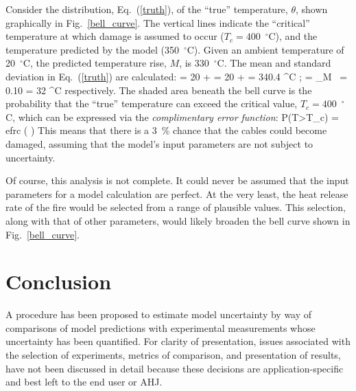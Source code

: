 Consider the distribution, Eq.~(\ref{truth}), of the ``true'' temperature, $\theta$, shown graphically in Fig.~\ref{bell_curve}.
The vertical lines indicate the ``critical'' temperature at which damage is assumed to occur ($T_c=400$~$^\circ$C), and the temperature predicted by the
model (350~$^\circ$C). Given an ambient temperature of 20~$^\circ$C, the predicted temperature rise, $M$, is 330~$^\circ$C.
The mean and standard deviation in Eq.~(\ref{truth}) are calculated:
\be \mu = 20 +  = 20 +  = 340.4 \; ^\circ \hbox{C}  \quad ; \quad
   \sigma = \widetilde{\sigma}_M \,  = 0.10 \times {} = 32 \; ^\circ \hbox{C}  \ee
respectively. The shaded area beneath the bell curve is the probability that the ``true'' temperature can exceed the
critical value, $T_c=400$~$^\circ$C, which can be expressed via the {\em complimentary error function}:
\be P(T>T_c) =  \hbox{efrc} \left(  \right)   \ee
This means that there is a 3~\% chance that the cables could become damaged, assuming that the model's input parameters are not
subject to uncertainty.

Of course, this analysis is not complete. It could never be assumed that the input parameters for a model calculation are perfect. At the very least, the heat
release rate of the fire would be selected from a range of plausible values. This selection, along with that of other parameters, would likely broaden the
bell curve shown in Fig.~\ref{bell_curve}.


\section{Conclusion}

A procedure has been proposed to estimate model uncertainty by way of comparisons of model predictions with experimental measurements whose uncertainty has been
quantified. For clarity of presentation, issues associated with the selection of experiments, metrics of comparison, and presentation of results, have not been
discussed in detail because these decisions are application-specific and best left to the end user or AHJ.



